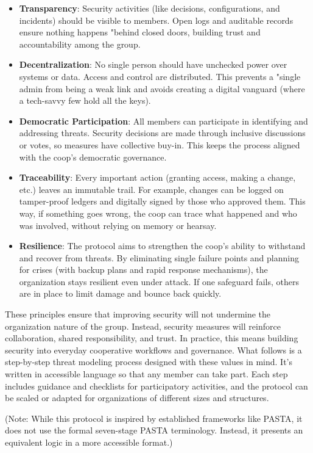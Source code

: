\begin{itemize}
    \item \textbf{Transparency}: Security activities (like decisions,
configurations, and incidents) should be visible to members. Open logs and
auditable records ensure nothing happens "behind closed doors, building trust
and accountability among the group.
    \item \textbf{Decentralization}: No single person should have unchecked
power over systems or data. Access and control are distributed. This prevents a
"single admin from being a weak link and avoids creating a digital vanguard
(where a tech-savvy few hold all the keys).
    \item \textbf{Democratic Participation}: All members can participate in
identifying and addressing threats. Security decisions are made through
inclusive discussions or votes, so measures have collective buy-in. This keeps
the process aligned with the coop's democratic governance.
    \item \textbf{Traceability}: Every important action (granting access, making
a change, etc.) leaves an immutable trail. For example, changes can be logged on
tamper-proof ledgers and digitally signed by those who approved them. This way,
if something goes wrong, the coop can trace what happened and who was involved,
without relying on memory or hearsay.
    \item \textbf{Resilience}: The protocol aims to strengthen the coop's
ability to withstand and recover from threats. By eliminating single failure
points and planning for crises (with backup plans and rapid response
mechanisms), the organization stays resilient even under attack. If one
safeguard fails, others are in place to limit damage and bounce back quickly.
\end{itemize}

These principles ensure that improving security will not undermine the
organization nature of the group. Instead, security measures will reinforce
collaboration, shared responsibility, and trust. In practice, this means
building security into everyday cooperative workflows and governance. What
follows is a step-by-step threat modeling process designed with these values in
mind. It's written in accessible language so that any member can take part.
Each step includes guidance and checklists for participatory activities,
and the protocol can be scaled or adapted for organizations of different
sizes and structures.

(Note: While this protocol is inspired by established frameworks like PASTA,
it does not use the formal seven-stage PASTA terminology. Instead, it
presents an equivalent logic in a more accessible format.)

